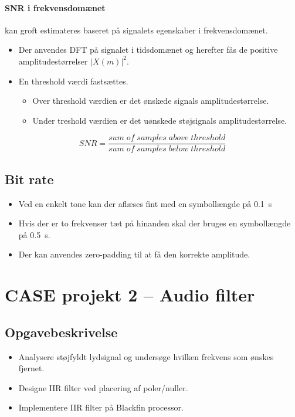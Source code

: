 \documentclass[danish]{article}
\begin{document}
\paragraph{SNR i frekvensdomænet} kan groft estimateres baseret på signalets egenskaber i frekvensdomænet.

\begin{itemize}
	\item Der anvendes DFT på signalet i tidsdomænet og herefter fås de positive amplitudestørrelser $|X(m)|^2$.
	\item En threshold værdi fastsættes.
	\begin{itemize}
		\item Over threshold værdien er det ønskede signals amplitudestørrelse.
		\item Under treshold værdien er det uønskede støjsignals amplitudestørrelse.
	\end{itemize}
\end{itemize}

\begin{equation}
SNR=  \frac{sum\;of\;samples\;above\;threshold}{sum\;of\;samples\;below\;threshold}
\end{equation}

\subsection{Bit rate}
\begin{itemize}
	\item Ved en enkelt tone kan der aflæses fint med en symbollængde på \SI{0,1}{\second}
	\item  Hvis der er to frekvenser tæt på hinanden skal der bruges en symbollængde på \SI{0,5}{\second}.
	\item Der kan anvendes zero-padding til at få den korrekte amplitude.
\end{itemize}

\newpage
\section{CASE projekt 2 – Audio filter}
\subsection{Opgavebeskrivelse}
\begin{itemize}
	\item Analysere støjfyldt lydsignal og undersøge hvilken frekvens som ønskes fjernet.
	\item Designe IIR filter ved placering af poler/nuller.
	\item Implementere IIR filter på Blackfin processor.
\end{itemize}
\end{document}
